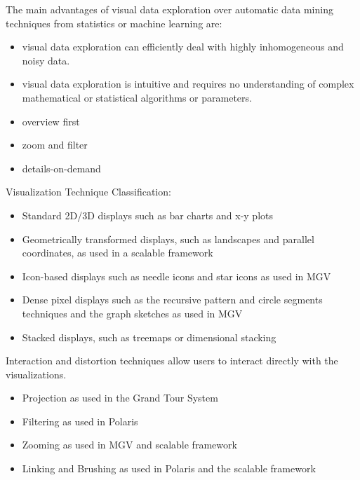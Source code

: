 \documentclass[print]{nuthesis}
\providecommand{\tightlist}{%
  \setlength{\itemsep}{0pt}\setlength{\parskip}{0pt}}
\begin{document}
The main advantages of visual data exploration over automatic data mining techniques from statistics or machine learning are:

\begin{itemize}
\tightlist
\item
  visual data exploration can efficiently deal with highly inhomogeneous and noisy data.
\item
  visual data exploration is intuitive and requires no understanding of complex mathematical or statistical algorithms or parameters.
\end{itemize}


\begin{itemize}
\tightlist
\item
  overview first
\item
  zoom and filter
\item
  details-on-demand
\end{itemize}


Visualization Technique Classification:

\begin{itemize}
\tightlist
\item
  Standard 2D/3D displays such as bar charts and x-y plots
\item
  Geometrically transformed displays, such as landscapes and parallel coordinates, as used in a scalable framework
\item
  Icon-based displays such as needle icons and star icons as used in MGV
\item
  Dense pixel displays such as the recursive pattern and circle segments techniques and the graph sketches as used in MGV
\item
  Stacked displays, such as treemaps or dimensional stacking
\end{itemize}

Interaction and distortion techniques allow users to interact directly with the visualizations.

\begin{itemize}
\tightlist
\item
  Projection as used in the Grand Tour System
\item
  Filtering as used in Polaris
\item
  Zooming as used in MGV and scalable framework
\item
  Linking and Brushing as used in Polaris and the scalable framework
\end{itemize}
\end{document}
